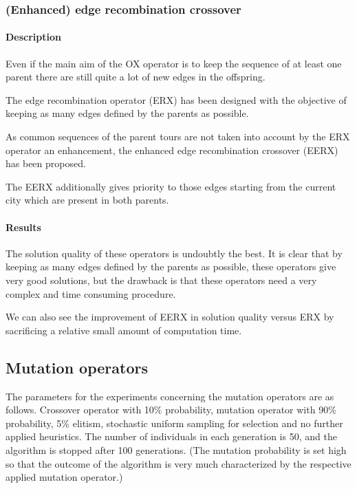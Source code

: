 \documentclass[a4paper,english,11pt,]{scrartcl}
\begin{document}
% 

\subsubsection{(Enhanced) edge recombination crossover}
\paragraph{Description}
Even if the main aim of the OX operator is to keep the sequence of at
least one parent there are still quite a lot of new edges in the offspring.

The edge recombination operator (ERX) has been designed with the
objective of keeping as many edges defined by the parents as possible.

As common sequences of the parent tours are not taken into account by
the ERX operator an enhancement, the enhanced
edge recombination crossover (EERX) has been proposed.

The EERX additionally gives priority to those edges starting from the
current city which are present in both parents.

\paragraph{Results}

The solution quality of these operators is undoubtly the best. It is clear that by keeping as many edges defined by the parents as possible, these operators give very good solutions, but the drawback is that these operators need a very complex and time consuming procedure.

We can also see the improvement of EERX in solution quality versus ERX by sacrificing a relative small amount of computation time.
% 

% 



\subsection{Mutation operators}
The parameters for the experiments concerning the mutation operators are as follows. Crossover operator with 10\% probability, mutation operator with 90\% probability, 5\% elitism, stochastic uniform sampling for selection and no further applied heuristics. The number of individuals in each generation is 50, and the algorithm is stopped after 100 generations. 
(The mutation probability is set high so that the outcome of the algorithm is very much characterized by the respective applied mutation operator.)
\end{document}
